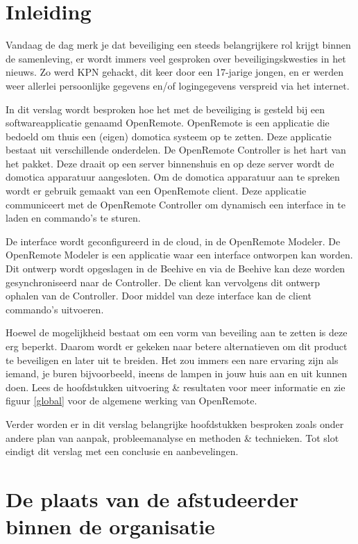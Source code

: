 \documentclass[]{article}
\begin{document}
\newpage
\thispagestyle{empty}
\tableofcontents
\thispagestyle{empty}
\newpage
\thispagestyle{empty}
\listoftables
\listoffigures

\newpage
\section{Inleiding}
Vandaag de dag merk je dat beveiliging een steeds belangrijkere rol krijgt binnen
de samenleving, er wordt immers veel gesproken over beveiligingskwesties in
het nieuws. Zo werd KPN gehackt, dit keer door een 17-jarige jongen, en
er werden weer allerlei persoonlijke gegevens en/of logingegevens verspreid via het
internet.

In dit verslag wordt besproken hoe het met de beveiliging is gesteld bij een
softwareapplicatie genaamd OpenRemote. OpenRemote is een applicatie die
bedoeld om thuis een (eigen) domotica systeem op te zetten. Deze applicatie
bestaat uit verschillende onderdelen. De OpenRemote Controller is het hart van
het pakket. Deze draait op een server binnenshuis en op deze server wordt de
domotica apparatuur aangesloten. Om de domotica apparatuur aan te spreken wordt
er gebruik gemaakt van een OpenRemote client. Deze applicatie communiceert met de
OpenRemote Controller om dynamisch een interface in te laden en commando's te
sturen. 

De interface wordt geconfigureerd in de cloud, in de OpenRemote Modeler. De
OpenRemote Modeler is een applicatie waar een interface ontworpen kan worden.
Dit ontwerp wordt opgeslagen in de Beehive en via de Beehive kan deze worden
gesynchroniseerd naar de Controller. De client kan vervolgens dit ontwerp
ophalen van de Controller. Door middel van deze interface kan de client
commando's uitvoeren. 

Hoewel de mogelijkheid bestaat om een vorm van beveiling aan te zetten is deze
erg beperkt. Daarom wordt er gekeken naar betere alternatieven om dit product te
beveiligen en later uit te breiden. Het zou immers een nare ervaring zijn als
iemand, je buren bijvoorbeeld, ineens de lampen in jouw huis aan en uit kunnen
doen. Lees de hoofdstukken uitvoering \& resultaten voor meer informatie en zie
figuur \ref{global} voor de algemene werking van OpenRemote.

Verder worden er in dit verslag belangrijke hoofdstukken besproken zoals onder andere
plan van aanpak, probleemanalyse en methoden \& technieken.
Tot slot eindigt dit verslag met een conclusie en aanbevelingen.

\newpage
\section{De plaats van de afstudeerder binnen de organisatie}
\end{document}
